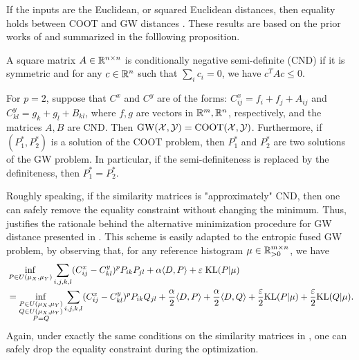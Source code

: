 If the inputs are the Euclidean, or squared Euclidean distances, then equality holds between
COOT and GW distances \citep{Sejourne20,Redko20}. These results are based on the prior works
of \citep{Konno76,Maron18} and summarized in the folllowing proposition.
\begin{definition}
  A square matrix $A \in \mathbb R^{n \times n}$ is conditionally negative semi-definite (CND)
  if it is symmetric and for any $c \in \mathbb R^n$ such that $\sum_i c_i = 0$, we have
  $c^T A c \leq 0$.
\end{definition}
\begin{proposition}
  \label{prop:coot_gw_equiv}
  For $p=2$, suppose that $C^x$ and $C^y$ are of the forms:
  $C^x_{ij} = f_i + f_j + A_{ij}$ and $C^y_{kl} = g_k + g_l + B_{kl}$,
  where $f, g$ are vectors in $\mathbb R^m, \mathbb R^n$, respectively,
  and the matrices $A, B$ are CND. Then $\text{GW}(\mathcal X, \mathcal Y) = \text{COOT}(\mathcal X, \mathcal Y)$.
  Furthermore, if $(P_1^*, P_2^*)$ is a solution of the COOT problem, then $P_1^*$ and $P_2^*$
  are two solutions of the GW problem. In particular,
  if the semi-definiteness is replaced by the definiteness, then $P_1^* = P_2^*$.
\end{proposition}
Roughly speaking, if the similarity matrices is "approximately" CND,
then one can safely remove the equality constraint without changing the minimum.
Thus,  justifies the rationale behind
the alternative minimization procedure for GW distance presented in .
This scheme is easily adapted to the entropic fused GW problem, by observing that,
for any reference histogram $\mu \in \mathbb R_{> 0}^{m \times n}$, we have
\begin{equation}
  \begin{split}
    &\inf_{\substack{P \in U(\mu_X, \mu_Y)}}
  \sum_{i,j,k,l} (C^x_{ij} - C^y_{kl})^p P_{ik} P_{jl}
  + \alpha \langle D, P \rangle + \varepsilon \; \text{KL}(P | \mu) \\
  &= \inf_{\substack{P \in U(\mu_X, \mu_Y) \\ Q \in U(\mu_X, \mu_Y) \\ P = Q }}
  \sum_{i,j,k,l} (C^x_{ij} - C^y_{kl})^p P_{ik} Q_{jl}
  + \frac{\alpha}{2} \langle D, P \rangle + \frac{\alpha}{2} \langle D, Q \rangle
  + \frac{\varepsilon}{2} \text{KL}(P | \mu) + \frac{\varepsilon}{2} \text{KL}(Q | \mu).
  \end{split}
\end{equation}
Again, under exactly the same conditions on the similarity matrices in ,
one can safely drop the equality constraint during the optimization.

